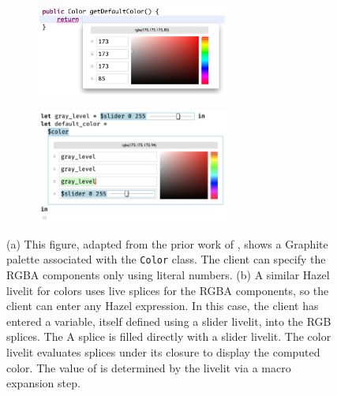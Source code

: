 \begin{figure}
  \begin{center}
    \begin{subfigure}[t]{0.5\textwidth}
      \centering
       \vspace{-3.4cm}
       \includegraphics[width=15pc]{graphite-color-palette.png}
      \vspace{0.1cm}
      \caption{}
    \end{subfigure}\begin{subfigure}[t]{0.5\textwidth}
      \centering
      \includegraphics[width=15pc]{slider-color-livelits.png}
      \vspace{-11px}
      \caption{}
    \end{subfigure}
  \end{center}
  \caption{
  (a) This figure, adapted from the prior work of \citet{Graphite},
  shows a Graphite palette associated with the \texttt{Color} class.
  The client can specify the RGBA components only using literal numbers.
  (b) A similar Hazel livelit for colors uses live splices for the RGBA components,
  so the client can enter any Hazel expression.
  In this case, the client has entered a variable, itself defined using a slider livelit, into the RGB
  splices. The A splice is filled directly with a slider livelit.
  The color livelit evaluates splices under its closure to display the
  computed color.
  The value of  is determined by the livelit via a macro expansion step.}
  \label{fig:color}
\end{figure}


